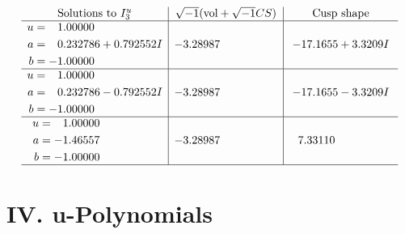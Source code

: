 \documentclass[1p]{elsarticle_modified}
\theoremstyle{definition}
\newcommand{\I}{\sqrt{-1}}
\begin{document}
$$\begin{array}{c|c|c}  
\text{Solutions to }I^u_{3}& \I (\text{vol} + \sqrt{-1}CS) & \text{Cusp shape}\\
 \hline 
\begin{aligned}
u &= \phantom{-}1.00000\phantom{ +0.000000I} \\
a &= \phantom{-}0.232786 + 0.792552 I \\
b &= -1.00000\phantom{ +0.000000I}\end{aligned}
 & -3.28987\phantom{ +0.000000I} & -17.1655 + 3.3209 I \\ \hline\begin{aligned}
u &= \phantom{-}1.00000\phantom{ +0.000000I} \\
a &= \phantom{-}0.232786 - 0.792552 I \\
b &= -1.00000\phantom{ +0.000000I}\end{aligned}
 & -3.28987\phantom{ +0.000000I} & -17.1655 - 3.3209 I \\ \hline\begin{aligned}
u &= \phantom{-}1.00000\phantom{ +0.000000I} \\
a &= -1.46557\phantom{ +0.000000I} \\
b &= -1.00000\phantom{ +0.000000I}\end{aligned}
 & -3.28987\phantom{ +0.000000I} & \phantom{-}7.33110\phantom{ +0.000000I}\\
 \hline 
 \end{array}$$\newpage
\newpage\renewcommand{\arraystretch}{1}
\centering \section*{ IV. u-Polynomials}
\end{document}
